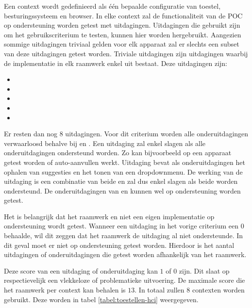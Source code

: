Een context wordt gedefinieerd als één bepaalde configuratie van toestel, besturingssysteem en browser.
In elke context zal de functionaliteit van de POC op ondersteuning worden getest met uitdagingen.
Uitdagingen die gebruikt zijn om het gebruikscriterium te testen, kunnen hier worden hergebruikt.
Aangezien sommige uitdagingen triviaal gelden voor elk apparaat zal er slechts een subset van deze uitdagingen getest worden.
Triviale uitdagingen zijn uitdagingen waarbij de implementatie in elk raamwerk enkel uit \js bestaat.
Deze uitdagingen zijn:
\begin{itemize}
 \item {}
 \item {}
 \item {}
 \item {}
 \item {}
\end{itemize}
Er resten dan nog $8$ uitdagingen.
Voor dit criterium worden alle onderuitdagingen verwaarloosd behalve bij  en .
Een uitdaging zal enkel slagen als alle onderuitdagingen ondersteund worden.
Zo kan bijvoorbeeld op een apparaat getest worden of auto-aanvullen werkt.
Uitdaging  bevat als onderuitdagingen het ophalen van suggesties en het tonen van een dropdownmenu.
De werking van de uitdaging is een combinatie van beide en zal dus enkel slagen als beide worden ondersteund.
De onderuitdagingen van  en  kunnen wel op ondersteuning worden getest.


Het is belangrijk dat het raamwerk en niet een eigen implementatie op ondersteuning wordt getest.
Wanneer een uitdaging in het vorige criterium een $0$ behaalde, wil dit zeggen dat het raamwerk de uitdaging al niet ondersteunde.
In dit geval moet er niet op ondersteuning getest worden.
Hierdoor is het aantal uitdagingen of onderuitdagingen die getest worden afhankelijk van het raamwerk.


Deze score van een uitdaging of onderuitdaging kan $1$ of $0$ zijn.
Dit slaat op respectievelijk een vlekkeloze of problematieke uitvoering.
De maximale score die het raamwerk per context kan behalen is $13$.
In totaal zullen $8$ contexten worden gebruikt.
Deze worden in tabel \ref{tabel:toestellen-hci} weergegeven.

